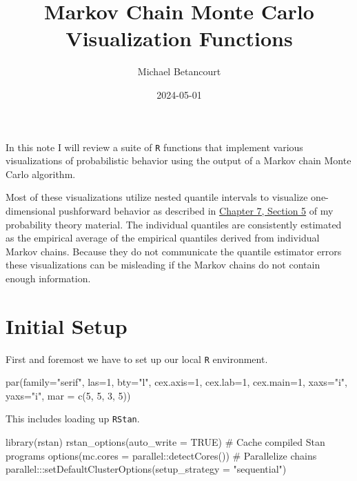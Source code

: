 \documentclass[
  letterpaper,
  DIV=11,
  numbers=noendperiod]{scrartcl}
\title{Markov Chain Monte Carlo Visualization Functions}
\author{Michael Betancourt}
\date{2024-05-01}
\newenvironment{Shaded}{\begin{snugshade}}{\end{snugshade}}
\newcommand{\AttributeTok}[1]{\textcolor[rgb]{0.40,0.45,0.13}{#1}}
\newcommand{\CommentTok}[1]{\textcolor[rgb]{0.37,0.37,0.37}{#1}}
\newcommand{\ConstantTok}[1]{\textcolor[rgb]{0.56,0.35,0.01}{#1}}
\newcommand{\DecValTok}[1]{\textcolor[rgb]{0.68,0.00,0.00}{#1}}
\newcommand{\FunctionTok}[1]{\textcolor[rgb]{0.28,0.35,0.67}{#1}}
\newcommand{\NormalTok}[1]{\textcolor[rgb]{0.00,0.23,0.31}{#1}}
\newcommand{\SpecialCharTok}[1]{\textcolor[rgb]{0.37,0.37,0.37}{#1}}
\newcommand{\StringTok}[1]{\textcolor[rgb]{0.13,0.47,0.30}{#1}}
\renewcommand*\contentsname{Table of contents}
\newcommand\contentsname{Table of contents}
\begin{document}
\maketitle

\renewcommand*\contentsname{Table of contents}
{
\hypersetup{linkcolor=}
\setcounter{tocdepth}{3}
\tableofcontents
}
In this note I will review a suite of \texttt{R} functions that
implement various visualizations of probabilistic behavior using the
output of a Markov chain Monte Carlo algorithm.

Most of these visualizations utilize nested quantile intervals to
visualize one-dimensional pushforward behavior as described in
\href{https://betanalpha.github.io/assets/chapters_html/transforming_probability_spaces.html\#sec:1d-pushforward-characterizations}{Chapter
7, Section 5} of my probability theory material. The individual
quantiles are consistently estimated as the empirical average of the
empirical quantiles derived from individual Markov chains. Because they
do not communicate the quantile estimator errors these visualizations
can be misleading if the Markov chains do not contain enough
information.

\section{Initial Setup}\label{initial-setup}

First and foremost we have to set up our local \texttt{R} environment.

\begin{Shaded}
\begin{Highlighting}[]
\FunctionTok{par}\NormalTok{(}\AttributeTok{family=}\StringTok{"serif"}\NormalTok{, }\AttributeTok{las=}\DecValTok{1}\NormalTok{, }\AttributeTok{bty=}\StringTok{"l"}\NormalTok{, }\AttributeTok{cex.axis=}\DecValTok{1}\NormalTok{, }\AttributeTok{cex.lab=}\DecValTok{1}\NormalTok{, }\AttributeTok{cex.main=}\DecValTok{1}\NormalTok{,}
    \AttributeTok{xaxs=}\StringTok{"i"}\NormalTok{, }\AttributeTok{yaxs=}\StringTok{"i"}\NormalTok{, }\AttributeTok{mar =} \FunctionTok{c}\NormalTok{(}\DecValTok{5}\NormalTok{, }\DecValTok{5}\NormalTok{, }\DecValTok{3}\NormalTok{, }\DecValTok{5}\NormalTok{))}
\end{Highlighting}
\end{Shaded}

This includes loading up \texttt{RStan}.

\begin{Shaded}
\begin{Highlighting}[]
\FunctionTok{library}\NormalTok{(rstan)}
\FunctionTok{rstan\_options}\NormalTok{(}\AttributeTok{auto\_write =} \ConstantTok{TRUE}\NormalTok{)            }\CommentTok{\# Cache compiled Stan programs}
\FunctionTok{options}\NormalTok{(}\AttributeTok{mc.cores =}\NormalTok{ parallel}\SpecialCharTok{::}\FunctionTok{detectCores}\NormalTok{()) }\CommentTok{\# Parallelize chains}
\NormalTok{parallel}\SpecialCharTok{:::}\FunctionTok{setDefaultClusterOptions}\NormalTok{(}\AttributeTok{setup\_strategy =} \StringTok{"sequential"}\NormalTok{)}
\end{Highlighting}
\end{Shaded}
\end{document}
